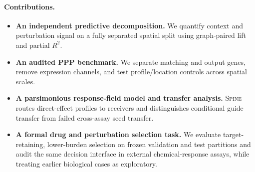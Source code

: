 \documentclass[sigconf,review,balance=false]{acmart}
\newcommand{\methodname}{\textsc{Spine}\xspace}
\newcommand{\ppp}{\textsc{PPP}\xspace}
\begin{document}
\paragraph{Contributions.}
\begin{itemize}
    \item \textbf{An independent predictive decomposition.}
    We quantify context and perturbation signal on a fully separated spatial
    split using graph-paired lift and partial $R^2$.
    \item \textbf{An audited \ppp benchmark.}
    We separate matching and output genes, remove expression channels, and test
    profile/location controls across spatial scales.
    \item \textbf{A parsimonious response-field model and transfer analysis.}
    \methodname{} routes direct-effect profiles to receivers and distinguishes
    conditional guide transfer from failed cross-assay seed transfer.
    \item \textbf{A formal drug and perturbation selection task.}
    We evaluate target-retaining, lower-burden selection on frozen validation
    and test partitions and audit the same decision interface in external
    chemical-response assays, while treating earlier biological cases as
    exploratory.
\end{itemize}
\end{document}

